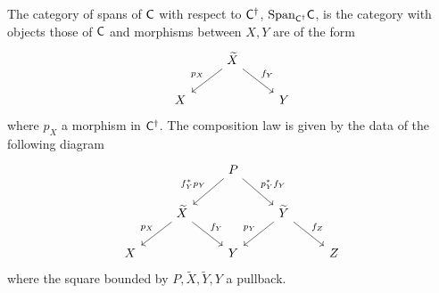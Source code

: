 \begin{definition}\label{def: category of spans}
	The category of spans of $\mathsf{C}$ with respect to $\mathsf{C}^{\dagger}$, $\mathrm{Span}_{\mathsf{C}^{\dagger}}\mathsf{C}$, is the category with objects those of $\mathsf{C}$ and morphisms between $X,Y$ are of the form 
	$$%
	\begin{tikzcd}
		& {\widetilde{X}} \\
		X && Y
		\arrow["{p_{X}}"', from=1-2, to=2-1]
		\arrow["{f_{Y}}", from=1-2, to=2-3]
	\end{tikzcd}$$
	where $p_{X}$ a morphism in $\mathsf{C}^{\dagger}$. The composition law is given by the data of the following diagram 
	$$%
	\begin{tikzcd}
		&& P \\
		& {\widetilde{X}} && {\widetilde{Y}} \\
		X && Y && Z
		\arrow["{p_{X}}"', from=2-2, to=3-1]
		\arrow["{f_{Y}}", from=2-2, to=3-3]
		\arrow["{p_{Y}}"', from=2-4, to=3-3]
		\arrow["{f_{Z}}", from=2-4, to=3-5]
		\arrow["{f_{Y}^{*}p_{Y}}"', from=1-3, to=2-2]
		\arrow["{p_{Y}^{*}f_{Y}}", from=1-3, to=2-4]
	\end{tikzcd}$$
	where the square bounded by $P,\widetilde{X},\widetilde{Y}, Y$ a pullback. 
\end{definition}
